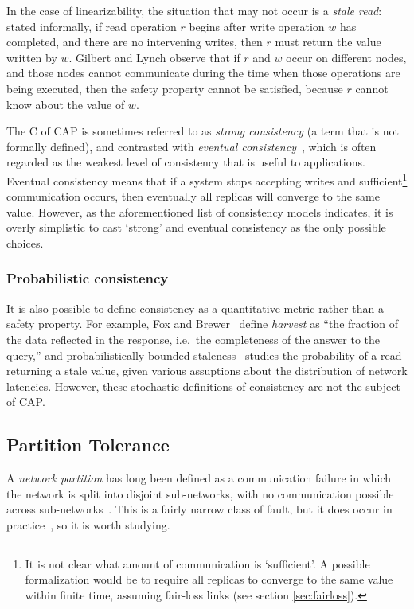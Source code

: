 \documentclass[a4paper,twocolumn,10pt]{article}
\begin{document}
In the case of linearizability, the situation that may not occur is a \emph{stale read}: stated
informally, if read operation $r$ begins after write operation $w$ has completed, and there are no
intervening writes, then $r$ must return the value written by $w$. Gilbert and Lynch observe that if
$r$ and $w$ occur on different nodes, and those nodes cannot communicate during the time when those
operations are being executed, then the safety property cannot be satisfied, because $r$ cannot know
about the value of $w$.

The C of CAP is sometimes referred to as \emph{strong consistency} (a term that is not formally
defined), and contrasted with \emph{eventual consistency}~\cite{Terry1994fp}, which is often
regarded as the weakest level of consistency that is useful to applications. Eventual consistency
means that if a system stops accepting writes and sufficient\footnote{It is not clear what amount of
communication is `sufficient'. A possible formalization would be to require all replicas to converge
to the same value within finite time, assuming fair-loss links (see section \ref{sec:fairloss}).}
communication occurs, then eventually all replicas will converge to the same value. However, as the
aforementioned list of consistency models indicates, it is overly simplistic to cast `strong' and
eventual consistency as the only possible choices.

\subsubsection{Probabilistic consistency}

It is also possible to define consistency as a quantitative metric rather than a safety property.
For example, Fox and Brewer~\cite{Fox1999bs} define \emph{harvest} as ``the fraction of the data
reflected in the response, i.e.\ the completeness of the answer to the query,'' and
probabilistically bounded staleness~\cite{Bailis2012to} studies the probability of a read returning
a stale value, given various assuptions about the distribution of network latencies. However, these
stochastic definitions of consistency are not the subject of CAP.

\subsection{Partition Tolerance}\label{sec:partitions}

A \emph{network partition} has long been defined as a communication failure in which the network is
split into disjoint sub-networks, with no communication possible across
sub-networks~\cite{Johnson1975we}. This is a fairly narrow class of fault, but it does occur in
practice~\cite{Bailis2014jx}, so it is worth studying.
\end{document}
